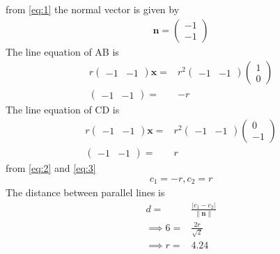 \documentclass[10pt]{article}
\newcommand{\myvec}[1]{\ensuremath{\begin{pmatrix}#1\end{pmatrix}}}
\providecommand{\norm}[1]{\left\lVert#1\right\rVert}
\providecommand{\abs}[1]{\left\vert#1\right\vert}
\let\vec\mathbf{}
\begin{document}
from \eqref{eq:1} the normal vector is given by
\begin{align}
\vec{n}=\myvec{-1\\-1}
\end{align}
The line equation of AB is 
\begin{align}
r\myvec{-1&-1}\vec{x}=&r^2\myvec{-1&-1}\myvec{1\\0}\\
\myvec{-1&-1}=&-r
\label{eq:2}
\end{align}
The line equation of CD is 
\begin{align}
r\myvec{-1&-1}\vec{x}=&r^2\myvec{-1&-1}\myvec{0\\-1}\\
\myvec{-1&-1}=&r
\label{eq:3}
\end{align}
from \eqref{eq:2} and \eqref{eq:3}
\begin{align}
c_1=-r,c_2=r
\end{align}
The distance between parallel lines is
\begin{align}
d=&\frac{\abs{c_1-c_2}}{\norm{\vec{n}}}\\
\implies 6=&\frac{2r}{\sqrt{2}}\\
\implies r=&4.24
\end{align}
\end{document}
